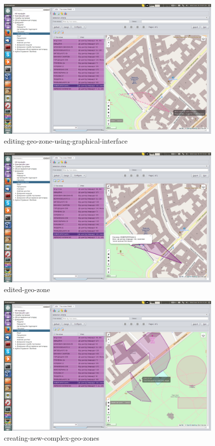 \begin{figure}[!htp]
\centering
\includegraphics[width=16cm]{chapters/01-geozones/images/05-editing-geo-zone-using-graphical-interface.png}
\caption{editing-geo-zone-using-graphical-interface}\label{fig:05}
\end{figure}

\begin{figure}[!htp]
\centering
\includegraphics[width=16cm]{chapters/01-geozones/images/06-edited-geo-zone.png}
\caption{edited-geo-zone}\label{fig:06}
\end{figure}

\begin{figure}[!htp]
\centering
\includegraphics[width=16cm]{chapters/01-geozones/images/07-creating-new-complex-geo-zones.png}
\caption{creating-new-complex-geo-zones}\label{fig:07}
\end{figure}

